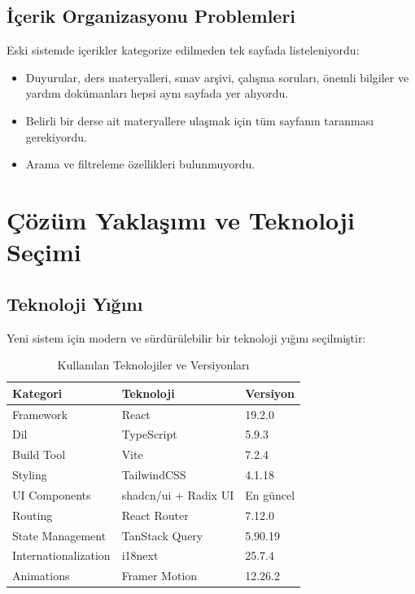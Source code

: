 \documentclass[12pt,a4paper]{article}
\begin{document}
\subsection{İçerik Organizasyonu Problemleri}

Eski sistemde içerikler kategorize edilmeden tek sayfada listeleniyordu:

\begin{itemize}[leftmargin=*]
    \item Duyurular, ders materyalleri, sınav arşivi, çalışma soruları, önemli bilgiler ve yardım dokümanları hepsi aynı sayfada yer alıyordu.
    \item Belirli bir derse ait materyallere ulaşmak için tüm sayfanın taranması gerekiyordu.
    \item Arama ve filtreleme özellikleri bulunmuyordu.
\end{itemize}

\section{Çözüm Yaklaşımı ve Teknoloji Seçimi}

\subsection{Teknoloji Yığını}

Yeni sistem için modern ve sürdürülebilir bir teknoloji yığını seçilmiştir:

\begin{table}[H]
\centering
\caption{Kullanılan Teknolojiler ve Versiyonları}
\begin{tabular}{@{}lll@{}}
\toprule
\textbf{Kategori} & \textbf{Teknoloji} & \textbf{Versiyon} \\
\midrule
Framework & React & 19.2.0 \\
Dil & TypeScript & 5.9.3 \\
Build Tool & Vite & 7.2.4 \\
Styling & TailwindCSS & 4.1.18 \\
UI Components & shadcn/ui + Radix UI & En güncel \\
Routing & React Router & 7.12.0 \\
State Management & TanStack Query & 5.90.19 \\
Internationalization & i18next & 25.7.4 \\
Animations & Framer Motion & 12.26.2 \\
\bottomrule
\end{tabular}
\end{table}
\end{document}
